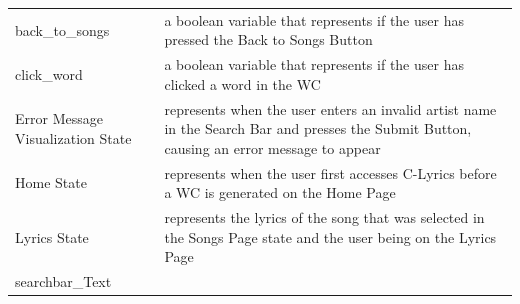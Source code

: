\documentclass[]{article}
\begin{document}
\begin{longtable}[c]{@{}ll@{}}
\\\addlinespace
\begin{minipage}[t]{0.47\columnwidth}\raggedright
back\_to\_songs
\end{minipage} & \begin{minipage}[t]{0.47\columnwidth}\raggedright
a boolean variable that represents if the user has pressed the Back to Songs Button
\end{minipage}
\\\addlinespace
\begin{minipage}[t]{0.47\columnwidth}\raggedright
click\_word
\end{minipage} & \begin{minipage}[t]{0.47\columnwidth}\raggedright
a boolean variable that represents if the user has clicked a word in the WC
\end{minipage}
\\\addlinespace
\begin{minipage}[t]{0.47\columnwidth}\raggedright
Error Message Visualization State
\end{minipage} & \begin{minipage}[t]{0.47\columnwidth}\raggedright
represents when the user enters an invalid artist name in the Search Bar and presses the Submit Button, causing an error message to appear
\end{minipage}
\\\addlinespace
\begin{minipage}[t]{0.47\columnwidth}\raggedright
Home State
\end{minipage} & \begin{minipage}[t]{0.47\columnwidth}\raggedright
represents when the user first accesses C-Lyrics before a WC is generated on the Home Page
\end{minipage}
\\\addlinespace
\begin{minipage}[t]{0.47\columnwidth}\raggedright
Lyrics State
\end{minipage} & \begin{minipage}[t]{0.47\columnwidth}\raggedright
represents the lyrics of the song that was selected in the Songs Page state and the user being on the Lyrics Page
\end{minipage}
\\\addlinespace
\begin{minipage}[t]{0.47\columnwidth}\raggedright
searchbar\_Text
\end{minipage} & \begin{minipage}[t]{0.47\columnwidth}\raggedright

\end{minipage}
\end{longtable}
\end{document}
